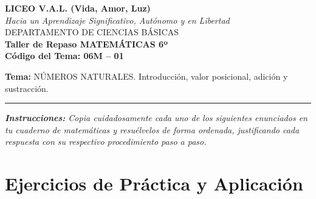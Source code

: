 \documentclass[12pt, letterpaper]{article}
\begin{document}
	
	\begin{center}
		{\Large \textbf{LICEO V.A.L. (Vida, Amor, Luz)}}\\[0.1cm]
		{\normalsize \textit{Hacia un Aprendizaje Significativo, Autónomo y en Libertad}}\\[0.2cm]
		{\large DEPARTAMENTO DE CIENCIAS BÁSICAS}\\[0.1cm]
		\textbf{Taller de Repaso MATEMÁTICAS 6º}\\[0.1cm]
		\textbf{Código del Tema: 06M – 01}\\[0.1cm]
	\end{center}
	
	\vspace{0.2cm}
	\noindent \textbf{Tema:} NÚMEROS NATURALES. Introducción, valor posicional, adición y sustracción.
	\vspace{0.2cm}
	\hrule
	\vspace{0.4cm}
	
	\noindent \textit{\textbf{Instrucciones:} Copia cuidadosamente cada uno de los siguientes enunciados en tu cuaderno de matemáticas y resuélvelos de forma ordenada, justificando cada respuesta con su respectivo procedimiento paso a paso.}
	\vspace{0.6cm}
	
	\section*{Ejercicios de Práctica y Aplicación}
	
\end{document}
